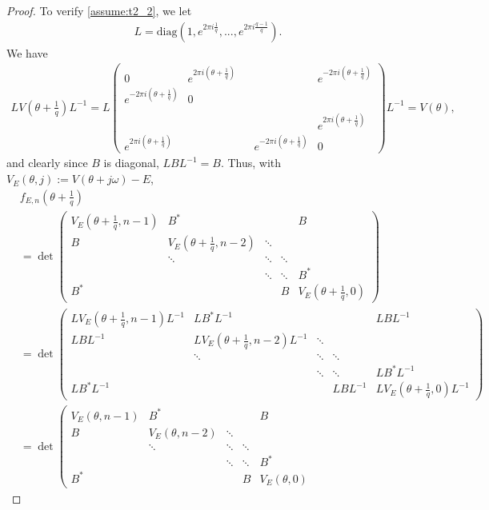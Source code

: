 \documentclass[11pt]{amsart}
\begin{document}
\begin{proof}
To verify \eqref{assume:t2_2}, we let 
\begin{align}
    L=\mathrm{diag}(1, e^{2\pi i\frac{1}{q}}, ..., e^{2\pi i \frac{q-1}{q}}). 
\end{align}
We have
\begin{align}
    LV(\theta+\frac{1}{q})L^{-1}=
    L\left(\begin{matrix}
    0 & e^{2\pi i (\theta+\frac{1}{q})} & & &e^{-2\pi i(\theta+\frac{1}{q})}\\
        e^{-2\pi i(\theta+\frac{1}{q})} &0 & & &\\
        \\
        & & & &e^{2\pi i(\theta+\frac{1}{q})}\\
        e^{2\pi i(\theta+\frac{1}{q})}& & &e^{-2\pi i(\theta+\frac{1}{q})} &0
    \end{matrix}\right)L^{-1}=V(\theta),
\end{align}
and clearly since $B$ is diagonal, $LBL^{-1}=B$. 
Thus, with $V_E(\theta,j):=V(\theta+j\omega)-E$,  
\begin{align}
       &f_{E,n}(\theta+\frac{1}{q})\\
&=
\det\left(\begin{matrix}
V_E(\theta+\frac{1}{q},n-1) & B^* & &  &B\\
B &V_E(\theta+\frac{1}{q},n-2) &\ddots \\
& \ddots &\ddots &\ddots \\
& &\ddots &\ddots &B^*\\
B^* & & &B &V_E(\theta+\frac{1}{q},0)
\end{matrix}\right)\\
&=
\det\left(\begin{matrix}
LV_E(\theta+\frac{1}{q},n-1)L^{-1} & LB^*L^{-1} & &  &LBL^{-1}\\
LBL^{-1} &LV_E(\theta+\frac{1}{q},n-2)L^{-1} &\ddots \\
& \ddots &\ddots &\ddots \\
& &\ddots &\ddots &LB^*L^{-1}\\
LB^*L^{-1} & & &LBL^{-1} &LV_E(\theta+\frac{1}{q},0)L^{-1}
\end{matrix}\right)\\
&=
\det\left(\begin{matrix}
V_E(\theta,n-1) & B^* & &  &B\\
B &V_E(\theta,n-2) &\ddots \\
& \ddots &\ddots &\ddots \\
& &\ddots &\ddots &B^*\\
B^* & & &B &V_E(\theta,0)

\end{matrix}
\end{align}
\end{proof}
\end{document}
